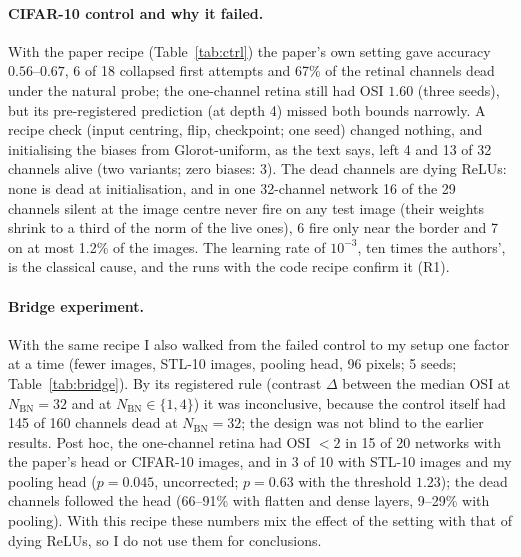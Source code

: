\documentclass[11pt,a4paper]{article}
\newcommand{\NBN}{N_{\mathrm{BN}}}
\begin{document}
\paragraph{CIFAR-10 control and why it failed.} With the paper recipe (Table~\ref{tab:ctrl}) the paper's own setting gave accuracy $0.56$--$0.67$, 6 of 18 collapsed first attempts and 67\% of the retinal channels dead under the natural probe; the one-channel retina still had OSI $1.60$ (three seeds), but its pre-registered prediction (at depth 4) missed both bounds narrowly. A recipe check (input centring, flip, checkpoint; one seed) changed nothing, and initialising the biases from Glorot-uniform, as the text says, left 4 and 13 of 32 channels alive (two variants; zero biases: 3). The dead channels are dying ReLUs: none is dead at initialisation, and in one 32-channel network 16 of the 29 channels silent at the image centre never fire on any test image (their weights shrink to a third of the norm of the live ones), 6 fire only near the border and 7 on at most 1.2\% of the images. The learning rate of $10^{-3}$, ten times the authors', is the classical cause, and the runs with the code recipe confirm it (R1).
\begin{table}[t]\centering\small

\caption{Paper recipe, CIFAR-10 control (paper's architecture, natural probe): collapsed first attempts, live channels out of the channels of the 3 seeds, center-surround labels and OSI (my implementation).}\label{tab:ctrl}
\end{table}

\paragraph{Bridge experiment.} With the same recipe I also walked from the failed control to my setup one factor at a time (fewer images, STL-10 images, pooling head, 96 pixels; 5 seeds; Table~\ref{tab:bridge}). By its registered rule (contrast $\Delta$ between the median OSI at $\NBN=32$ and at $\NBN\in\{1,4\}$) it was inconclusive, because the control itself had 145 of 160 channels dead at $\NBN=32$; the design was not blind to the earlier results. Post hoc, the one-channel retina had OSI $<2$ in 15 of 20 networks with the paper's head or CIFAR-10 images, and in 3 of 10 with STL-10 images and my pooling head ($p=0.045$, uncorrected; $p=0.63$ with the threshold $1.23$); the dead channels followed the head (66--91\% with flatten and dense layers, 9--29\% with pooling). With this recipe these numbers mix the effect of the setting with that of dying ReLUs, so I do not use them for conclusions.
\begin{table}[t]\centering\footnotesize

\caption{Paper recipe, bridge experiment (retina depth 2, cortex depth 2, 5 seeds): channels dead out of 160 at $\NBN=32$, median OSI of the five one-channel retinas (in brackets: how many below 2), and the registered contrast $\Delta$ with its 90\% bootstrap interval.}\label{tab:bridge}
\end{table}
\end{document}
